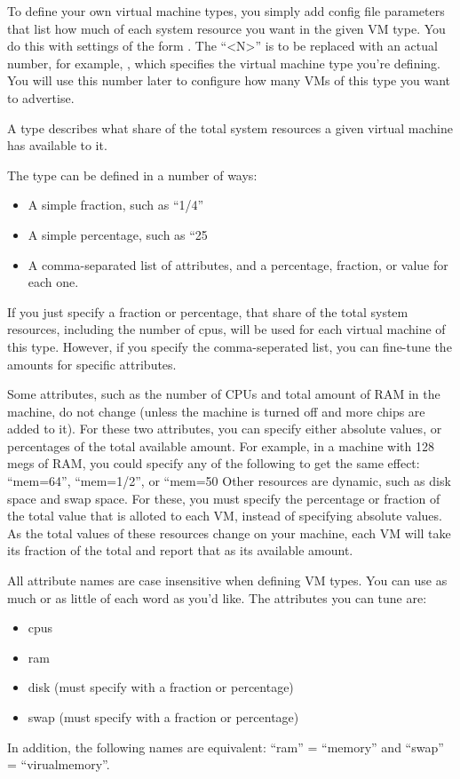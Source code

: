 To define your own virtual machine types, you simply add config file
parameters that list how much of each system resource you want in the
given VM type.  You do this with settings of the form
.
The ``<N>'' is to be replaced with an actual number, for example, 
, which specifies the virtual 
machine type you're defining.
You will use this number later to configure how many VMs of this type
you want to advertise.

A type describes what share of the total system resources a given
virtual machine has available to it.

The type can be defined in a number of ways:
\begin{itemize}
  \item A simple fraction, such as ``1/4''
  \item A simple percentage, such as ``25%
  \item A comma-separated list of attributes, and a percentage,
	fraction, or value for each one.
\end{itemize}
If you just specify a fraction or percentage, that share of the total
system resources, including the number of cpus, will be used for each
virtual machine of this type.
However, if you specify the comma-seperated list, you can fine-tune
the amounts for specific attributes.

Some attributes, such as the number of CPUs and total amount of RAM in
the machine, do not change (unless the machine is turned off and more
chips are added to it).
For these two attributes, you can specify either absolute values, or
percentages of the total available amount.  
For example, in a machine with 128 megs of RAM, you could specify any
of the following to get the same effect: ``mem=64'', ``mem=1/2'', or
``mem=50%
Other resources are dynamic, such as disk space and swap space.
For these, you must specify the percentage or fraction of the total
value that is alloted to each VM, instead of specifying absolute values.
As the total values of these resources change on your machine, each
VM will take its fraction of the total and report that as its
available amount.

All attribute names are case insensitive when defining VM types.
You can use as much or as little of each word as you'd like.
The attributes you can tune are:
\begin{itemize}
  \item cpus
  \item ram
  \item disk (must specify with a fraction or percentage)
  \item swap (must specify with a fraction or percentage)
\end{itemize}
In addition, the following names are equivalent: ``ram'' = ``memory''
and ``swap'' = ``virualmemory''.

